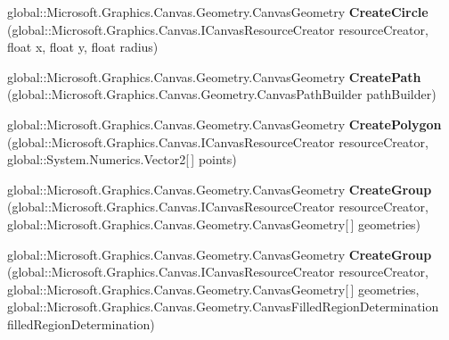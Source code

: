 \begin{DoxyCompactItemize}
global\+::\+Microsoft.\+Graphics.\+Canvas.\+Geometry.\+Canvas\+Geometry {\bfseries Create\+Circle} (global\+::\+Microsoft.\+Graphics.\+Canvas.\+I\+Canvas\+Resource\+Creator resource\+Creator, float x, float y, float radius)
\item 
\mbox{\label{interface_microsoft_1_1_graphics_1_1_canvas_1_1_geometry_1_1_i_canvas_geometry_statics_a9b464d06c47609c3d62de903eb4c611e}} 
global\+::\+Microsoft.\+Graphics.\+Canvas.\+Geometry.\+Canvas\+Geometry {\bfseries Create\+Path} (global\+::\+Microsoft.\+Graphics.\+Canvas.\+Geometry.\+Canvas\+Path\+Builder path\+Builder)
\item 
\mbox{\label{interface_microsoft_1_1_graphics_1_1_canvas_1_1_geometry_1_1_i_canvas_geometry_statics_aad896d1f9173e8b37733e3174e9e0321}} 
global\+::\+Microsoft.\+Graphics.\+Canvas.\+Geometry.\+Canvas\+Geometry {\bfseries Create\+Polygon} (global\+::\+Microsoft.\+Graphics.\+Canvas.\+I\+Canvas\+Resource\+Creator resource\+Creator, global\+::\+System.\+Numerics.\+Vector2\mbox{[}$\,$\mbox{]} points)
\item 
\mbox{\label{interface_microsoft_1_1_graphics_1_1_canvas_1_1_geometry_1_1_i_canvas_geometry_statics_af80ea6b6f5c0b36d0284b7ea487eaafd}} 
global\+::\+Microsoft.\+Graphics.\+Canvas.\+Geometry.\+Canvas\+Geometry {\bfseries Create\+Group} (global\+::\+Microsoft.\+Graphics.\+Canvas.\+I\+Canvas\+Resource\+Creator resource\+Creator, global\+::\+Microsoft.\+Graphics.\+Canvas.\+Geometry.\+Canvas\+Geometry\mbox{[}$\,$\mbox{]} geometries)
\item 
\mbox{\label{interface_microsoft_1_1_graphics_1_1_canvas_1_1_geometry_1_1_i_canvas_geometry_statics_a12df4abd73ae08fddb2cd7e68c84a78b}} 
global\+::\+Microsoft.\+Graphics.\+Canvas.\+Geometry.\+Canvas\+Geometry {\bfseries Create\+Group} (global\+::\+Microsoft.\+Graphics.\+Canvas.\+I\+Canvas\+Resource\+Creator resource\+Creator, global\+::\+Microsoft.\+Graphics.\+Canvas.\+Geometry.\+Canvas\+Geometry\mbox{[}$\,$\mbox{]} geometries, global\+::\+Microsoft.\+Graphics.\+Canvas.\+Geometry.\+Canvas\+Filled\+Region\+Determination filled\+Region\+Determination)

\end{DoxyCompactItemize}
